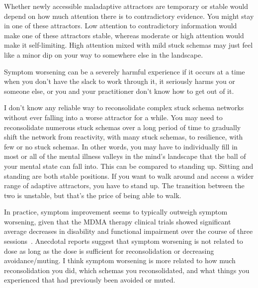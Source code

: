\documentclass[11pt,oneside]{book}
\let\cite\parencite
\begin{document}
Whether newly accessible maladaptive attractors are temporary or stable would depend on how much attention there is to contradictory evidence. You might stay in one of these attractors. Low attention to contradictory information would make one of these attractors stable, whereas moderate or high attention would make it self-limiting. High attention mixed with mild stuck schemas may just feel like a minor dip on your way to somewhere else in the landscape.

Symptom worsening can be a severely harmful experience if it occurs at a time when you don't have the slack to work through it, it seriously harms you or someone else, or you and your practitioner don't know how to get out of it.

I don't know any reliable way to reconsolidate complex stuck schema networks without ever falling into a worse attractor for a while. You may need to reconsolidate numerous stuck schemas over a long period of time to gradually shift the network from reactivity, with many stuck schemas, to resilience, with few or no stuck schemas. In other words, you may have to individually fill in most or all of the mental illness valleys in the mind's landscape that the ball of your mental state can fall into. This can be compared to standing up. Sitting and standing are both stable positions. If you want to walk around and access a wider range of adaptive attractors, you have to stand up. The transition between the two is unstable, but that's the price of being able to walk.

In practice, symptom improvement seems to typically outweigh symptom worsening, given that the MDMA therapy clinical trials showed significant average decreases in disability and functional impairment over the course of three sessions~\cite{mitchellMDMAClinicalTrial,mitchellMDMAClinicalTrial2}. Anecdotal reports suggest that symptom worsening is not related to dose as long as the dose is sufficient for reconsolidation or decreasing avoidance/muting. I think symptom worsening is more related to how much reconsolidation you did, which schemas you reconsolidated, and what things you experienced that had previously been avoided or muted.
\end{document}
